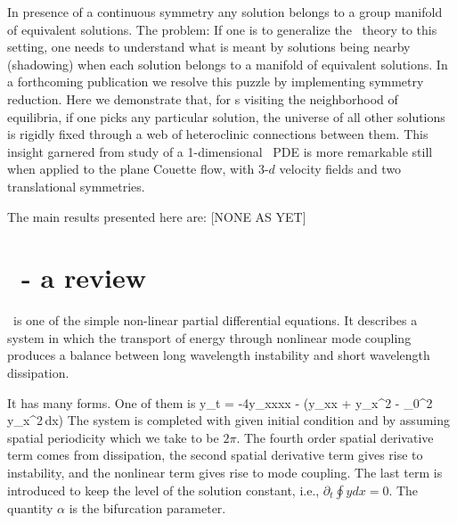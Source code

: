 In presence of a continuous symmetry any solution belongs to a group
manifold of equivalent solutions. The problem: If one is to
generalize the \po\  theory to this setting, one needs to
understand what is meant by solutions being nearby (shadowing) when
each solution belongs to a manifold of equivalent solutions. {In a
forthcoming publication we resolve this puzzle by implementing
symmetry reduction.} Here we demonstrate that, {for \rpo s visiting the
neighborhood of equilibria,} if one picks any
particular solution, the universe of all other solutions is rigidly
fixed through a web of heteroclinic connections between them. This
insight garnered from study of a 1-dimensional \KS\ PDE is more
remarkable still when applied to the plane Couette flow,
with 3-$d$ velocity fields and two translational symmetries.

The main results presented here are: [NONE AS YET]

\section{\KSe\ - a review}
\label{chap:KSreview}

\KSe\ is one of the simple non-linear partial
differential equations. It describes a system in which the transport of
energy through nonlinear mode coupling produces a balance between long
wavelength instability and short wavelength dissipation.

It has many forms. One of them is 
\beq
y_t = -4y_{xxxx} - \alpha(y_{xx} + y_x^2 - \int_0^{2\pi} y_x^2\,dx)
\eeq
The system is completed with given initial condition and by assuming
spatial periodicity which we take to be $2\pi$. The fourth order spatial
derivative term comes from dissipation, the second spatial derivative
term gives rise to instability, and the nonlinear term gives rise to mode
coupling. The last term is introduced to keep the level of the solution
constant, i.e., $\partial_t \oint ydx = 0$. The quantity $\alpha$ is the
bifurcation parameter.

